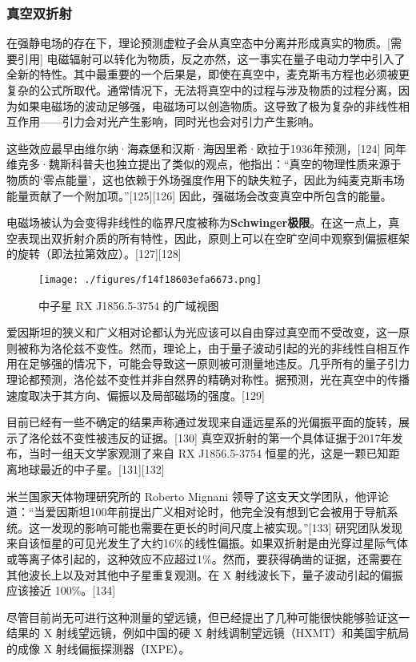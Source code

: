 \subsubsection{真空双折射}
在强静电场的存在下，理论预测虚粒子会从真空态中分离并形成真实的物质。[需要引用] 电磁辐射可以转化为物质，反之亦然，这一事实在量子电动力学中引入了全新的特性。其中最重要的一个后果是，即使在真空中，麦克斯韦方程也必须被更复杂的公式所取代。通常情况下，无法将真空中的过程与涉及物质的过程分离，因为如果电磁场的波动足够强，电磁场可以创造物质。这导致了极为复杂的非线性相互作用——引力会对光产生影响，同时光也会对引力产生影响。

这些效应最早由维尔纳·海森堡和汉斯·海因里希·欧拉于1936年预测，[124] 同年维克多·魏斯科普夫也独立提出了类似的观点，他指出：“真空的物理性质来源于物质的‘零点能量’，这也依赖于外场强度作用下的缺失粒子，因此为纯麦克斯韦场能量贡献了一个附加项。”[125][126] 因此，强磁场会改变真空中所包含的能量。

电磁场被认为会变得非线性的临界尺度被称为\textbf{Schwinger极限}。在这一点上，真空表现出双折射介质的所有特性，因此，原则上可以在空旷空间中观察到偏振框架的旋转（即法拉第效应）。[127][128]
\begin{figure}[ht]
\centering
\texttt{[image: ./figures/f14f18603efa6673.png]}
\caption{中子星 RX J1856.5-3754 的广域视图} \label{fig_LD_14}
\end{figure}
爱因斯坦的狭义和广义相对论都认为光应该可以自由穿过真空而不受改变，这一原则被称为洛伦兹不变性。然而，理论上，由于量子波动引起的光的非线性自相互作用在足够强的情况下，可能会导致这一原则被可测量地违反。几乎所有的量子引力理论都预测，洛伦兹不变性并非自然界的精确对称性。据预测，光在真空中的传播速度取决于其方向、偏振以及局部磁场的强度。[129]

目前已经有一些不确定的结果声称通过发现来自遥远星系的光偏振平面的旋转，展示了洛伦兹不变性被违反的证据。[130] 真空双折射的第一个具体证据于2017年发布，当时一组天文学家观测了来自 RX J1856.5-3754 恒星的光，这是一颗已知距离地球最近的中子星。[131][132]

米兰国家天体物理研究所的 Roberto Mignani 领导了这支天文学团队，他评论道：“当爱因斯坦100年前提出广义相对论时，他完全没有想到它会被用于导航系统。这一发现的影响可能也需要在更长的时间尺度上被实现。”[133] 研究团队发现来自该恒星的可见光发生了大约16\%的线性偏振。如果双折射是由光穿过星际气体或等离子体引起的，这种效应不应超过1\%。然而，要获得确凿的证据，还需要在其他波长上以及对其他中子星重复观测。在 X 射线波长下，量子波动引起的偏振应该接近 100\%。[134]

尽管目前尚无可进行这种测量的望远镜，但已经提出了几种可能很快能够验证这一结果的 X 射线望远镜，例如中国的硬 X 射线调制望远镜（HXMT）和美国宇航局的成像 X 射线偏振探测器（IXPE）。
